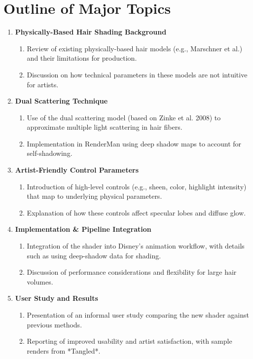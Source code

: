 \documentclass[12pt]{article}
\begin{document}
\section{Outline of Major Topics}
\begin{enumerate}[noitemsep]
    \item \textbf{Physically-Based Hair Shading Background}
    \begin{enumerate}[noitemsep]
        \item Review of existing physically-based hair models (e.g., Marschner et al.) and their limitations for production.
        \item Discussion on how technical parameters in these models are not intuitive for artists.
    \end{enumerate}
    
    \item \textbf{Dual Scattering Technique}
    \begin{enumerate}[noitemsep]
        \item Use of the dual scattering model (based on Zinke et al. 2008) to approximate multiple light scattering in hair fibers.
        \item Implementation in RenderMan using deep shadow maps to account for self-shadowing.
    \end{enumerate}
    
    \item \textbf{Artist-Friendly Control Parameters}
    \begin{enumerate}[noitemsep]
        \item Introduction of high-level controls (e.g., sheen, color, highlight intensity) that map to underlying physical parameters.
        \item Explanation of how these controls affect specular lobes and diffuse glow.
    \end{enumerate}
    
    \item \textbf{Implementation \& Pipeline Integration}
    \begin{enumerate}[noitemsep]
        \item Integration of the shader into Disney's animation workflow, with details such as using deep-shadow data for shading.
        \item Discussion of performance considerations and flexibility for large hair volumes.
    \end{enumerate}
    
    \item \textbf{User Study and Results}
    \begin{enumerate}[noitemsep]
        \item Presentation of an informal user study comparing the new shader against previous methods.
        \item Reporting of improved usability and artist satisfaction, with sample renders from *Tangled*.
    \end{enumerate}
\end{enumerate}
\end{document}
